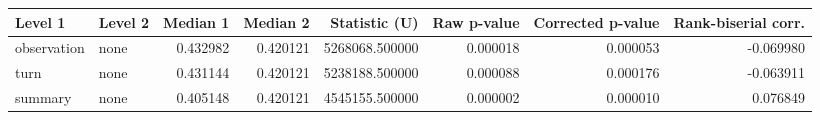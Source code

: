 \begin{tabular}{llrrrrrr}
\toprule
Level 1 & Level 2 & Median 1 & Median 2 & Statistic (U) & Raw p-value & Corrected p-value & Rank-biserial corr. \\
\midrule
observation & none & 0.432982 & 0.420121 & 5268068.500000 & 0.000018 & 0.000053 & -0.069980 \\
turn & none & 0.431144 & 0.420121 & 5238188.500000 & 0.000088 & 0.000176 & -0.063911 \\
summary & none & 0.405148 & 0.420121 & 4545155.500000 & 0.000002 & 0.000010 & 0.076849 \\
\bottomrule
\end{tabular}
